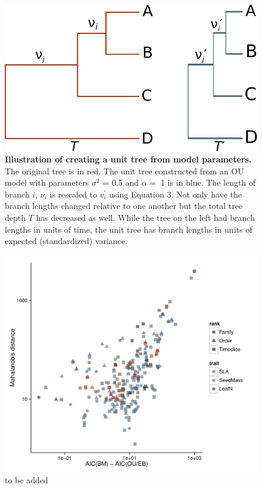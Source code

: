 \documentclass[a4paper,12pt]{article}
\begin{document}
\begin{figure}[p]
  \centering
  \includegraphics{figs/unit-tree}
  \caption{\textbf{Illustration of creating a unit tree from model parameters.} The original tree is in red. The unit tree constructed from an OU model with parameters $\sigma^2$ = 0.5 and $\alpha=$ 1 is in blue. The length of branch $i$, $\nu_i$ is rescaled to $v_i^\prime$ using Equation 3. Not only have the branch lengths changed relative to one another but the total tree depth $T$ has decreased as well. While the tree on the left had branch lengths in units of time, the unit tree has branch lengths in units of expected (standardized) variance.}
  \label{fig:box1}
\end{figure}

\renewcommand\thefigure{S\arabic{figure}}
\renewcommand\thetable{S \arabic{table}}
\setcounter{figure}{0}    
\setcounter{table}{0}


\begin{figure}[p]
  \centering
  \includegraphics[scale=0.9]{figs/ad-aic}
  \caption{to be added}
  \label{fig:supp-ad-aic}
\end{figure} 
\end{document}
